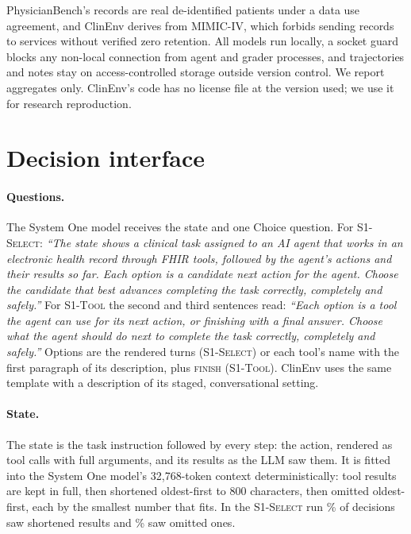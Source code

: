 \documentclass[11pt]{article}
\newcommand{\sel}{\textsc{S1-Select}}
\newcommand{\tool}{\textsc{S1-Tool}}
\begin{document}
PhysicianBench's records are real de-identified patients under a data use agreement, and ClinEnv derives from MIMIC-IV,
which forbids sending records to services without verified zero retention. All models run locally, a socket guard
blocks any non-local connection from agent and grader processes, and trajectories and notes stay on access-controlled
storage outside version control. We report aggregates only. ClinEnv's code has no license file at the version used;
we use it for research reproduction.



\appendix

\section{Decision interface}\label{app:interface}

\paragraph{Questions.} The System One model receives the state and one Choice question. For \sel{}: \emph{``The state
shows a clinical task assigned to an AI agent that works in an electronic health record through FHIR tools, followed
by the agent's actions and their results so far. Each option is a candidate next action for the agent. Choose the
candidate that best advances completing the task correctly, completely and safely.''} For \tool{} the second and third
sentences read: \emph{``Each option is a tool the agent can use for its next action, or finishing with a final answer.
Choose what the agent should do next to complete the task correctly, completely and safely.''} Options are the
rendered turns (\sel) or each tool's name with the first paragraph of its description, plus \textsc{finish} (\tool).
ClinEnv uses the same template with a description of its staged, conversational setting.

\paragraph{State.} The state is the task instruction followed by every step: the action, rendered as tool calls with
full arguments, and its results as the LLM saw them. It is fitted into the System One model's 32,768-token context
deterministically: tool results are kept in full, then shortened oldest-first to 800 characters, then omitted
oldest-first, each by the smallest number that fits. In the \sel{} run \DECSelshort\% of decisions saw shortened
results and \DECSelomit\% saw omitted ones.
\end{document}
